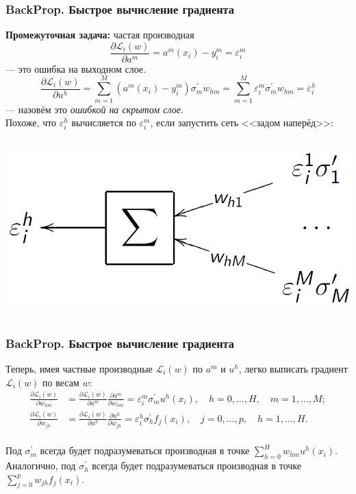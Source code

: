 \documentclass[10pt]{beamer}
\begin{document}
\begin{frame}
\frametitle{BackProp. Быстрое вычисление градиента}
\textbf{Промежуточная задача:} частая производная 
\begin{equation*}
 \frac{\partial \mathscr{L}_i(w)}{\partial a^m} = a^m(x_i) - y_i^m = \varepsilon_i^m
\end{equation*}
--- это ошибка на выходном слое.
\begin{equation*}
 \frac{\partial \mathscr{L}_i(w)}{\partial u^h} = \sum_{m=1}^{M}(a^m(x_i) - y_i^m) \sigma^{'}_m w_{hm} =\sum_{m=1}^{M} \varepsilon_i^m  \sigma^{'}_m w_{hm} =\varepsilon_i^h
\end{equation*}
--- назовём это \textit{ошибкой на скрытом слое}. \\
\vspace{0.4cm}
Похоже, что $\varepsilon_i^h$ вычисляется по $\varepsilon_i^m$, если запустить сеть <<задом наперёд>>:
  \begin{columns}
   \begin{center}
	\includegraphics[scale=0.2]{backprop}
	\end{center}
    
\end{columns} 
\end{frame} 

\begin{frame}
\frametitle{BackProp. Быстрое вычисление градиента}
Теперь, имея частные производные $\mathscr{L}_i(w)$ по $a^m$ и $u^h$, легко выписать градиент $\mathscr{L}_i(w)$ по весам $w$:
\\
\vspace{0.4cm} 
\begin{align*}
\frac{\partial \mathscr{L}_i(w)}{\partial w_{hm}} &= \frac{\partial \mathscr{L}_i(w)}{\partial a^m} \frac{\partial a^m}{\partial w_{hm}}=\varepsilon_i^m \sigma_m^{'} u^h(x_i), \quad h=0,\ldots,H, \quad  m=1,\ldots,M; \\
\frac{\partial \mathscr{L}_i(w)}{\partial w_{jh}} &= \frac{\partial \mathscr{L}_i(w)}{\partial u^h} \frac{\partial u^h}{\partial w_{jh}}=\varepsilon_i^h \sigma_h^{'} f_j(x_{i}), \quad j=0,\ldots,p, \quad h=1,\ldots,H.
\end{align*}
\\
\vspace{0.7cm} 
 Под $ \sigma^{'}_m$ всегда будет подразумеваться производная в точке $\sum_{h=0}^{H} w_{hm} u^h(x_i)$. Аналогично, под $\sigma^{'}_h$ всегда будет подразумеваться производная в точке $\sum_{j=0}^{p} w_{jh} f_j(x_{i})$.  
\end{frame} 
\end{document}
